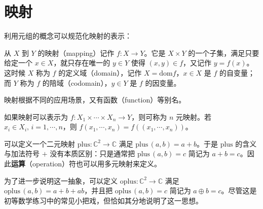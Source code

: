 \documentclass[cn,10pt,math=newtx,citestyle=gb7714-2015,bibstyle=gb7714-2015]{elegantbook}
\def\C{\mathbb C}
\def\ra{\rightarrow}
\begin{document}
\section{映射}
利用元组的概念可以规范化映射的表示：
\begin{definition}[映射]
   从 $X$ 到 $Y$ 的映射（mapping）记作 $f:X\ra Y$。它是 $X\times Y$ 的一个子集，满足只要给定一个 $x\in X$，就只存在唯一的 $y\in Y$ 使得 $(x,y)\in f$，又记作 $y=f(x)$。这时候 $X$ 称为 $f$ 的定义域（domain），记作 $X=\text{dom} f$，$x\in X$ 是 $f$ 的自变量；而 $Y$ 称为 $f$ 的陪域（codomain），$y\in Y$ 是 $f$ 的因变量。
\end{definition}
映射根据不同的应用场景，又有函数（function）等别名。
\begin{definition}[多元映射]
   如果映射可以表示为 $f:X_1\times\cdots\times X_n\ra Y$，则可称为 $n$ 元映射。若 $x_i\in X_i,\,i=1,\cdots,n$，则 $f(x_1,\cdots,x_n)=f((x_1,\cdots,x_n))$。
\end{definition}
\begin{instance}
可以定义一个二元映射 $\text{plus}:\C^2\ra \C$ 满足 $\text{plus}\,(a,b)=a+b$。于是 $\text{plus}$ 的含义与加法符号 $+$ 没有本质区别：只是通常把 $\text{plus}\,(a,b)=c$ 简记为 $a+b=c$。因此\textbf{运算}（operation）符也可以用多元映射来定义。
\end{instance}
\begin{instance}
为了进一步说明这一抽象，可以定义 $\text{oplus}:\C^2\ra \C$ 满足 $\text{oplus}\,(a,b)=a+b+ab$，并且把 $\text{oplus}\,(a,b)=c$ 简记为 $a\oplus b=c$。尽管这是初等数学练习中的常见小把戏，但恰如其分地说明了这一思想。
\end{instance}
\end{document}
